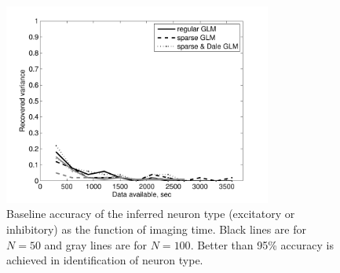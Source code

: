 \begin{figure}[h]
	\centering
\includegraphics[width=250pt]{../figs/Figure11_inhexc_errors}
\caption{Baseline accuracy of the inferred neuron type (excitatory or inhibitory) as the function of imaging time. Black lines are for $N=50$ and gray lines are for $N=100$. Better than 95\% accuracy
is achieved in identification of neuron type.}
\label{fig:data-ie}
\end{figure}




